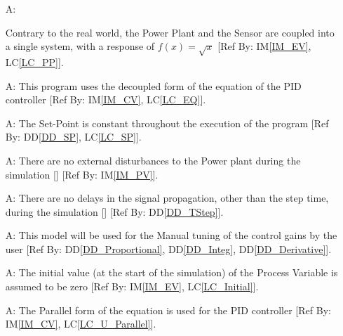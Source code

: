 \documentclass[12pt]{article}
\newcommand{\ddref}[1]{DD\ref{#1}}
\newcounter{assumpnum} %
\newcommand{\iref}[1]{IM\ref{#1}}
\newcommand{\lcref}[1]{LC\ref{#1}}
\begin{document}
\begin{itemize}

\item[A\refstepcounter{assumpnum}\theassumpnum \label{A_PP}:]
	
    Contrary to the real world, the Power Plant and the Sensor are coupled 
    into a single system, with a response of $f(x) = \sqrt{x}$ [Ref By: 
    \iref{IM_EV}, \lcref{LC_PP}].

\item[A\refstepcounter{assumpnum}\theassumpnum \label{A_EQ}:] This program uses
 the decoupled form of the equation of the PID controller [Ref By: \iref{IM_CV}, 
    \lcref{LC_EQ}].

\item[A\refstepcounter{assumpnum}\theassumpnum \label{A_SP}:] The Set-Point is 
constant throughout the execution of the program [Ref By: \ddref{DD_SP}, 
    \lcref{LC_SP}].

\item[A\refstepcounter{assumpnum}\theassumpnum \label{A_Attn}:] There are no 
external disturbances to the Power plant during the simulation [\cite{PID_Wiki}]
[Ref By: \iref{IM_PV}].

\item[A\refstepcounter{assumpnum}\theassumpnum \label{A_Delay}:] There are no 
delays in the signal propagation, other than the step time,
during the simulation [\cite{PID_Wiki}] [Ref By: \ddref{DD_TStep}].

\item[A\refstepcounter{assumpnum}\theassumpnum \label{A_Tuning}:] This model 
will be used for the Manual tuning of the control gains by the user 
[Ref By: \ddref{DD_Proportional}, \ddref{DD_Integ}, \ddref{DD_Derivative}].

\item[A\refstepcounter{assumpnum}\theassumpnum \label{A_Initial}:] The initial
value (at the start of the simulation) of the Process Variable is assumed to be 
zero [Ref By: \iref{IM_EV}, \lcref{LC_Initial}].

\item[A\refstepcounter{assumpnum}\theassumpnum \label{A_Parallel}:] The Parallel
form of the equation is used for the PID controller 
[Ref By: \iref{IM_CV}, \lcref{LC_U_Parallel}].

\end{itemize}
\end{document}
